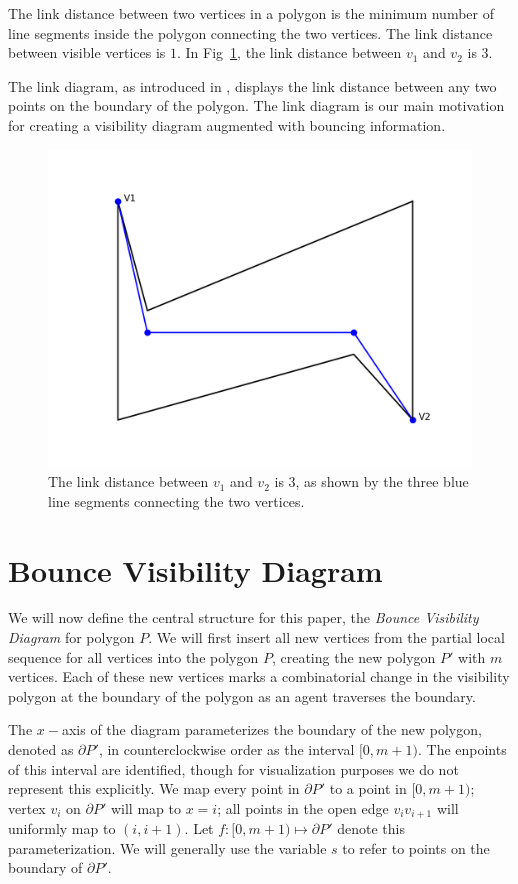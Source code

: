 \documentclass[]{styles/svproc}  %
\begin{document}
The link distance between two vertices in a polygon is the minimum number of line segments inside the polygon connecting the two vertices. The link distance between visible vertices is $1$. In Fig~\ref{fig:link_dis}, the link distance between $v_1$ and $v_2$ is 3.

The link diagram, as introduced in \cite{tan_sweep}, displays the link distance between any two points on the boundary of the polygon. The link diagram is our main motivation for creating a visibility diagram augmented with bouncing information.
\begin{figure}
    \includegraphics[width=0.6\linewidth]{figures/link_distance.png}
    \centering
    \caption{The link distance between $v_1$ and $v_2$ is 3, as shown by the three blue line segments connecting the two vertices.}\label{fig:link_dis}
    \centering
\end{figure}

\section{Bounce Visibility Diagram \label{bvd_def}}
We will now define the central structure for this paper, the
\textit{Bounce Visibility Diagram} for polygon $P$. We will first insert all new
vertices from the partial local sequence for all vertices into the
polygon $P$, creating the new polygon $P'$ with $m$ vertices. Each of these new
vertices marks a combinatorial change in the visibility polygon at the boundary
of the polygon as an agent traverses the boundary.

The $x-$axis of the diagram parameterizes the boundary of the new polygon,
denoted as $\partial P'$, in counterclockwise order as the interval $[0, m+1)$. The
enpoints of this interval are identified, though for visualization purposes we
do not represent this explicitly. We map every
point in $\partial P'$ to a point in $[0, m+1)$; vertex $v_i$ on $\partial P'$
will map to $x = i$; all points in the open edge $v_iv_{i+1}$ will uniformly map
to $(i, i+1)$. Let $f: [0, m+1)\mapsto \partial P'$ denote this
parameterization. We will generally use the variable $s$ to refer to points on
the boundary of $\partial P'$.
\end{document}
